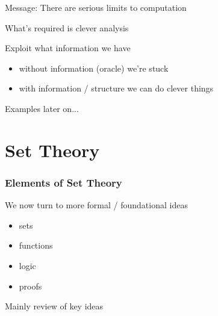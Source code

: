\begin{frame}

    Message: There are serious limits to computation

    What's required is clever analysis

    Exploit what information we have

    \begin{itemize}
        \item without information (oracle) we're stuck 
        \item with information / structure we can do clever things
    \end{itemize}

    \vspace{1em}

    Examples later on...

\end{frame}



\section{Set Theory}

\begin{frame}

    \begin{center}
    \end{center}
    
    \begin{center}
    \end{center}

\end{frame}

\begin{frame}
    \frametitle{Elements of Set Theory}

    We now turn to more formal / foundational ideas

    \begin{itemize}
        \item sets
        \item functions
        \item logic
        \item proofs
    \end{itemize}

    Mainly review of key ideas
    
\end{frame}


